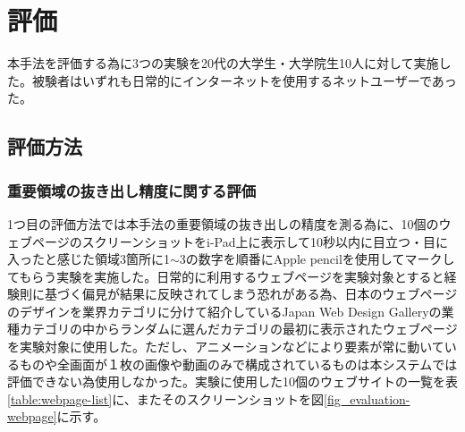 \newpage
\renewcommand{\baselinestretch}{1.5}
\section{評価}
\renewcommand{\baselinestretch}{1}

本手法を評価する為に3つの実験を20代の大学生・大学院生10人に対して実施した。被験者はいずれも日常的にインターネットを使用するネットユーザーであった。

\subsection{評価方法}
\subsubsection{重要領域の抜き出し精度に関する評価}
\par 1つ目の評価方法では本手法の重要領域の抜き出しの精度を測る為に、10個のウェブページのスクリーンショットをi-Pad上に表示して10秒以内に目立つ・目に入ったと感じた領域3箇所に1$\sim$3の数字を順番にApple pencilを使用してマークしてもらう実験を実施した。日常的に利用するウェブページを実験対象とすると経験則に基づく偏見が結果に反映されてしまう恐れがある為、日本のウェブページのデザインを業界カテゴリに分けて紹介しているJapan Web Design Gallery\cite{japanwebgallery}の業種カテゴリの中からランダムに選んだカテゴリの最初に表示されたウェブページを実験対象に使用した。ただし、アニメーションなどにより要素が常に動いているものや全画面が１枚の画像や動画のみで構成されているものは本システムでは評価できない為使用しなかった。実験に使用した10個のウェブサイトの一覧を表\ref{table:webpage-list}に、またそのスクリーンショットを図\ref{fig_evaluation-webpage}に示す。


